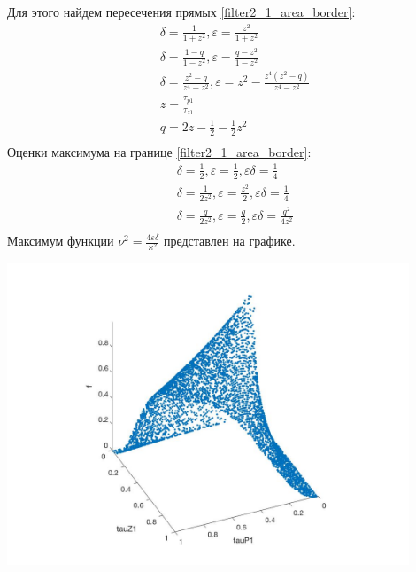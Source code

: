 \documentclass[a4paper,14pt]{extarticle} %
\begin{document}
 Для этого найдем пересечения прямых \eqref{filter2_1_area_border}:
  \begin{equation}
 \begin{aligned}
&\delta = \frac{1}{1+z^2}, \varepsilon = \frac{z^2}{1+z^2}\\
&\delta = \frac{1-q}{1-z^2}, \varepsilon = \frac{q-z^2}{1-z^2}\\
&\delta = \frac{z^2-q}{z^4-z^2}, \varepsilon = z^2 - \frac{z^4(z^2-q)}{z^4-z^2}\\
&z = \frac{\tau_{p1}}{\tau_{z1}}\\
&q = 2z - \frac{1}{2} - \frac{1}{2}z^2\\
 \end{aligned}
\end{equation}
Оценки максимума на границе \eqref{filter2_1_area_border}:
  \begin{equation}
 \begin{aligned}
&\delta = \frac{1}{2}, \varepsilon = \frac{1}{2}, \varepsilon\delta = \frac{1}{4}\\
&\delta = \frac{1}{2z^2}, \varepsilon = \frac{z^2}{2}, \varepsilon\delta = \frac{1}{4}\\
&\delta = \frac{q}{2z^2}, \varepsilon = \frac{q}{2}, \varepsilon\delta = \frac{q^2}{4z^2}\\
 \end{aligned}
\end{equation}
  Максимум функции $\nu^2 = \frac{4\varepsilon\delta}{\varkappa^2}$ представлен на графике.

\includegraphics[width=12cm]{images/filter2_tau0.jpg}\\
\end{document}
